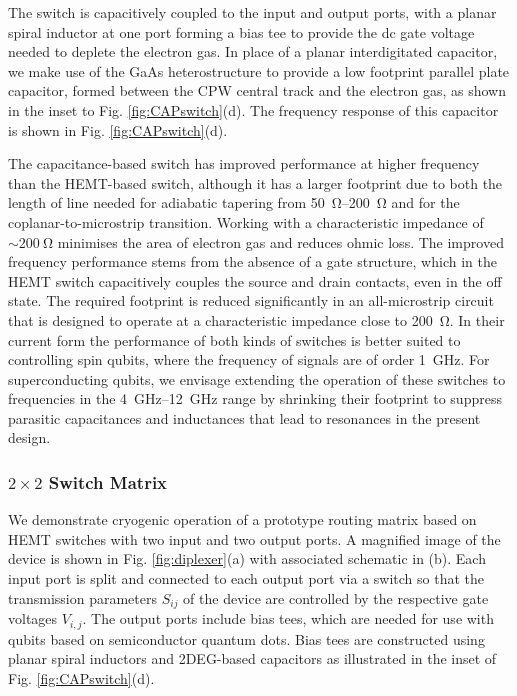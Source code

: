 The switch is capacitively coupled to the input and output ports, with a planar spiral inductor at one port forming a bias tee to provide the dc gate voltage needed to deplete the electron gas. In place of a planar interdigitated capacitor, we make use of the GaAs heterostructure to provide a low footprint parallel plate capacitor, formed between the CPW central track and the electron gas, as shown in the inset to Fig. \ref{fig:CAPswitch}(d). The frequency response of this capacitor is shown in Fig. \ref{fig:CAPswitch}(d).

The capacitance-based switch has improved performance at higher frequency than the HEMT-based switch, although it has a larger footprint due to both the length of line needed for adiabatic tapering from \SIrange{50}{200}{\ohm} and for the coplanar-to-microstrip transition. Working with a characteristic impedance of $\sim \SI{200}{\ohm}$ minimises the area of electron gas and reduces ohmic loss. The improved frequency performance stems from the absence of a gate structure, which in the HEMT switch capacitively couples the source and drain contacts, even in the off state. The required footprint is reduced significantly in an all-microstrip circuit that is designed to operate at a characteristic impedance close to \SI{200}{\ohm}. In their current form the performance of both kinds of switches is better suited to controlling spin qubits, where the frequency of signals are of order \SI{1}{\giga\hertz}. For superconducting qubits, we envisage extending the operation of these switches to frequencies in the \SIrange{4}{12}{\giga\hertz} range by shrinking their footprint to suppress parasitic capacitances and inductances that lead to resonances in the present design.

\subsubsection{$2\times2$ Switch Matrix}
We demonstrate cryogenic operation of a prototype routing matrix based on HEMT switches with two input and two output ports. A magnified image of the device is shown in Fig. \ref{fig:diplexer}(a) with associated schematic in (b). Each input port is split and connected to each output port via a switch so that the transmission parameters $S_{ij}$ of the device are controlled by the respective gate voltages $V_{i,j}$. The output ports include bias tees, which are needed for use with qubits based on semiconductor quantum dots.  Bias tees are constructed using planar spiral inductors and 2DEG-based capacitors as illustrated in the inset of Fig. \ref{fig:CAPswitch}(d).

